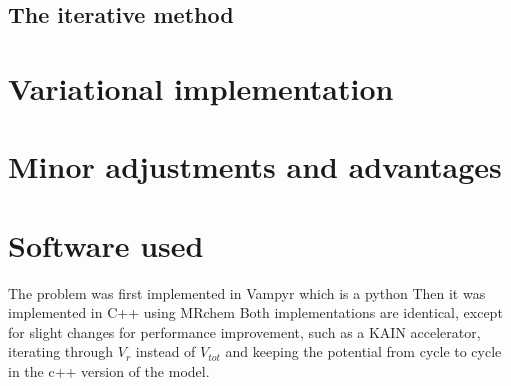 \documentclass[../master_thesis.tex]{subfiles}
\begin{document}
\subsection{The iterative method}
\section{Variational implementation}
\section{Minor adjustments and advantages}

\section{Software used}
The problem was first implemented in Vampyr %
which is a python %
Then it was implemented in C++ using MRchem %
Both implementations are identical, except for slight changes for
performance improvement, such as a KAIN accelerator, %
iterating through $V_r$ instead of $V_{tot}$ %
and keeping the potential from cycle to cycle
in the c++ version of the model.



\biblio
\end{document}
